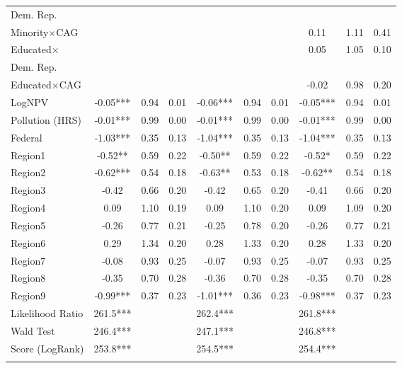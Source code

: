 \documentclass[12pt]{article}
\begin{document}
{\begin{table}[H]
{\begin{tabular}{lccc|ccc|ccc}
			 \hspace{10pt}Dem. Rep. & & & & & & & & & \\
			Minority$\times$CAG &       &       &       &       &       &       &  {0.11} &  {1.11}  & {0.41} \\
			Educated$\times$ &       &       &       &       &       &       & \multirow{2}{*}{0.05} & \multirow{2}{*}{1.05}  & \multirow{2}{*}{0.10} \\
			\hspace{10pt}Dem. Rep. & & & & & & & & & \\
			Educated$\times$CAG &       &       &       &       &       &       &-0.02 & 0.98  & 0.20 \\
			LogNPV & -0.05*** & 0.94  & 0.01  & -0.06*** & 0.94  & 0.01  & -0.05*** & 0.94  & 0.01 \\
			Pollution (HRS)& -0.01*** & 0.99  & 0.00  & -0.01*** & 0.99  & 0.00  & -0.01*** & 0.99  & 0.00 \\
			Federal & -1.03*** & 0.35  & 0.13  & -1.04*** & 0.35  & 0.13  & -1.04*** & 0.35  & 0.13 \\
			Region1 & -0.52** & 0.59  & 0.22  & -0.50** & 0.59  & 0.22  & -0.52* & 0.59  & 0.22 \\
			Region2 & -0.62*** & 0.54  & 0.18  & -0.63** & 0.53  & 0.18  & -0.62** & 0.54  & 0.18 \\
			Region3 & -0.42 & 0.66  & 0.20  & -0.42 & 0.65  & 0.20  & -0.41 & 0.66  & 0.20 \\
			Region4 & 0.09  & 1.10  & 0.19  & 0.09  & 1.10  & 0.20  & 0.09  & 1.09  & 0.20 \\
			Region5 & -0.26 & 0.77  & 0.21  & -0.25 & 0.78  & 0.20  & -0.26 & 0.77  & 0.21 \\
			Region6 & 0.29  & 1.34  & 0.20  & 0.28  & 1.33  & 0.20  & 0.28  & 1.33  & 0.20 \\
			Region7 & -0.08 & 0.93  & 0.25  & -0.07 & 0.93  & 0.25  & -0.07 & 0.93  & 0.25 \\
			Region8 & -0.35 & 0.70  & 0.28  & -0.36 & 0.70  & 0.28  & -0.35 & 0.70  & 0.28 \\
			Region9 & -0.99*** & 0.37  & 0.23  & -1.01*** & 0.36  & 0.23  & -0.98*** & 0.37  & 0.23 \\						
			\hline 
		Likelihood Ratio & 261.5***  & & &
			262.4*** &  & &
			261.8*** & &\\ 
			Wald Test & 246.4*** & & &
			247.1*** & & &
			246.8*** & &\\
			Score (LogRank) & 253.8*** & & &
			254.5*** &  & &
			254.4*** & &\\
			\hline
			\addlinespace[1ex]
			\multicolumn{3}{l}{\textsuperscript{***}$p\leq0.001$, 
				\textsuperscript{**}$p\leq0.01$, 
				\textsuperscript{*}$p\leq0.05$}
	\end{tabular}}
\end{table}

}
\end{document}
